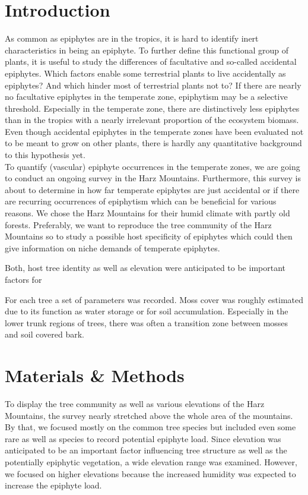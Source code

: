 \documentclass[12pt, a4paper,oneside]{article}
\begin{document}
\section{Introduction}
As common as epiphytes are in the tropics, it is hard to identify inert characteristics in being an epiphyte. To further define this functional group of plants, it is useful to study the differences of facultative and so-called accidental epiphytes. Which factors enable some terrestrial plants to live accidentally as epiphytes? And which hinder most of terrestrial plants not to? If there are nearly no facultative epiphytes in the temperate zone, epiphytism may be a selective threshold. Especially in the temperate zone, there are distinctively less epiphytes than in the tropics with a nearly irrelevant proportion of the ecosystem biomass. Even though accidental epiphytes in the temperate zones have been evaluated not to be meant to grow on other plants, there is hardly any quantitative background to this hypothesis yet.\\

To quantify (vascular) epiphyte occurrences in the temperate zones, we are going to conduct an ongoing survey in the Harz Mountains. Furthermore, this survey is about to determine in how far temperate epiphytes are just accidental or if there are recurring occurrences of epiphytism which can be beneficial for various reasons. We chose the Harz Mountains for their humid climate with partly old forests. Preferably, we want to reproduce the tree community of the Harz Mountains so to study a possible host specificity of epiphytes which could then give information on niche demands of temperate epiphytes.

Both, host tree identity as well as elevation were anticipated to be important factors for%

For each tree a set of parameters was recorded. Moss cover was roughly estimated due to its function as water storage or for soil accumulation. 
Especially in the lower trunk regions of trees, there was often a transition zone between mosses and soil covered bark. 

\section{Materials \& Methods}
To display the tree community as well as various elevations of the Harz Mountains, the survey nearly stretched above the whole area of the mountains. By that, we focused mostly on the common tree species but included even some rare as well as  species to record potential epiphyte load. Since elevation was anticipated to be an important factor  influencing tree structure as well as the potentially epiphytic vegetation, a wide elevation range was examined. However, we focused on higher elevations because the increased humidity was expected to increase the epiphyte load.
\end{document}
